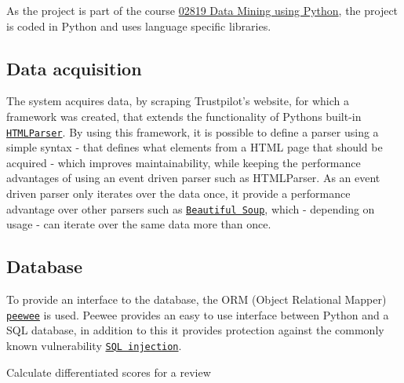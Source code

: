 \documentclass[10pt]{IEEEtran}
\begin{document}
As the project is part of the course \href{http://www.kurser.dtu.dk/02819.aspx?menulanguage=en-GB}{02819 Data Mining using Python}, the project is coded in Python and uses language specific libraries.

\subsection{Data acquisition}
The system acquires data, by scraping Trustpilot's website, for which a framework was created, that extends the functionality of Pythons built-in \href{http://docs.python.org/2/library/htmlparser.html}{\texttt{HTMLParser}}. By using this framework, it is possible to define a parser using a simple syntax - that defines what elements from a HTML page that should be acquired - which improves maintainability, while keeping the performance advantages of using an event driven parser such as HTMLParser. As an event driven parser only iterates over the data once, it provide a performance advantage over other parsers such as \href{http://www.crummy.com/software/BeautifulSoup/}{\texttt{Beautiful Soup}}, which - depending on usage - can iterate over the same data more than once.

\subsection{Database}
To provide an interface to the database, the ORM (Object Relational Mapper) \href{http://peewee.readthedocs.org/en/latest/}{\texttt{peewee}} is used. Peewee provides an easy to use interface between Python and a SQL database, in addition to this it provides protection against the commonly known vulnerability \href{https://www.owasp.org/index.php/Top_10_2013-A1-Injection}{\texttt{SQL injection}}.

\begin{algorithm}[h!]
\caption{Calculate differentiated scores for a review \label{alg:differentiated}}
\end{algorithm}
\end{document}
